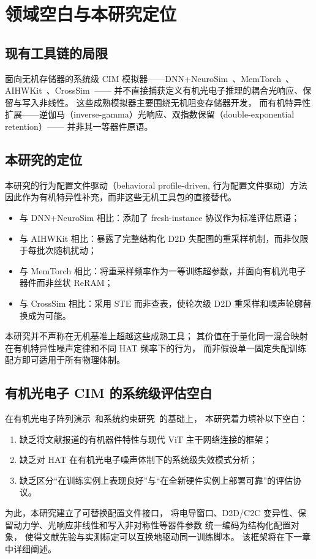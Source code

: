 \section{领域空白与本研究定位}

\subsection{现有工具链的局限}

面向无机存储器的系统级 CIM 模拟器——DNN+NeuroSim~\parencite{peng2020dnnneurosim}、MemTorch~\parencite{lammie2022memtorch}、AIHWKit~\parencite{rasch2021aihwkit}、CrossSim~\parencite{crosssim2024}——
并不直接捕获定义有机光电子推理的耦合光响应、保留与写入非线性。
这些成熟模拟器主要围绕无机阻变存储器开发，
而有机特异性扩展——逆伽马（inverse-gamma）光响应、双指数保留（double-exponential retention）——
并非其一等器件原语。

\subsection{本研究的定位}

本研究的行为配置文件驱动（behavioral profile-driven, 行为配置文件驱动）方法因此作为有机特异性补充，而非这些无机工具包的直接替代。
\begin{itemize}
    \item 与 DNN+NeuroSim 相比：添加了 fresh-instance 协议作为标准评估原语；
    \item 与 AIHWKit 相比：暴露了完整结构化 D2D 失配图的重采样机制，而非仅限于每批次随机扰动；
    \item 与 MemTorch 相比：将重采样频率作为一等训练超参数，并面向有机光电子器件而非丝状 ReRAM；
    \item 与 CrossSim 相比：采用 STE 而非查表，使轮次级 D2D 重采样和噪声轮廓替换成为可能。
\end{itemize}

本研究并不声称在无机基准上超越这些成熟工具；
其价值在于量化同一混合映射在有机特异性噪声定律和不同 HAT 频率下的行为，
而非假设单一固定失配训练配方即可适用于所有物理体制。

\subsection{有机光电子 CIM 的系统级评估空白}

在有机光电子阵列演示~\parencite{gebregiorgis2023organiccim,zhang2025opect,zhang2025mooptoelectronic,cui2025multimode}和系统约束研究~\parencite{visionarch2023crosstalk,amspa2024insensor,jang2023insensor,fuller2020tempresilient,guo2024hightemp}的基础上，
本研究着力填补以下空白：
\begin{enumerate}
    \item 缺乏将文献报道的有机器件特性与现代 ViT 主干网络连接的框架；
    \item 缺乏对 HAT 在有机光电子噪声体制下的系统级失效模式分析；
    \item 缺乏区分``在训练实例上表现良好''与``在全新硬件实例上部署可靠''的评估协议。
\end{enumerate}

为此，本研究建立了可替换配置文件接口，
将电导窗口、D2D/C2C 变异性、保留动力学、光响应非线性和写入非对称性等器件参数
统一编码为结构化配置对象，
使得文献先验与实测标定可以互换地驱动同一训练脚本。
该框架将在下一章中详细阐述。
